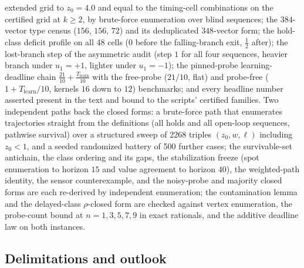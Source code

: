 \documentclass[10pt,twocolumn]{article}
\theoremstyle{plain}
\theoremstyle{definition}
\theoremstyle{remark}
\begin{document}
extended grid to \(z_{0} = 4.0\) and equal to the timing-cell
combinations on the certified grid at \(k \ge 2\), by brute-force
enumeration over blind sequences; the \(384\)-vector type census
(\(156\), \(156\), \(72\)) and its deduplicated \(348\)-vector
form; the hold-class deficit profile on all 48 cells (\(0\) before the
falling-branch exit, \(\tfrac{1}{2}\) after); the lost-branch step of
the asymmetric audit (step \(1\) for all four sequences, heavier
branch under \(u_{1} = +1\), lighter under \(u_{1} = -1\)); the
pinned-probe learning-deadline chain
\(\tfrac{21}{10} + \tfrac{T_{\mathrm{learn}}}{10}\) with the
free-probe (\(21/10\), flat) and probe-free
(\(1 + T_{\mathrm{learn}}/10\), kernels \(16\) down to \(12\))
benchmarks; and every headline
number asserted present in the text and bound to the scripts' certified families. Two independent paths back the closed forms: a
brute-force path that enumerates trajectories straight from the
definitions (all holds and all open-loop sequences, pathwise survival)
over a structured sweep of 2268 triples
\((z_{0}, w, \ell)\) including \(z_{0} < 1\), and a seeded
randomized battery of 500 further cases; the survivable-set antichain,
the class ordering and its gaps, the stabilization freeze (spot
enumeration to horizon \(15\) and value agreement to horizon
\(40\)), the weighted-path identity, the sensor counterexample, and
the noisy-probe and majority closed forms are each re-derived by
independent enumeration; the contamination lemma and the delayed-class
\(\rho\)-closed form are checked against vertex enumeration, the
probe-count bound at \(n = 1, 3, 5, 7, 9\) in exact rationals, and the
additive deadline law on both instances.

\subsection{Delimitations and outlook}\label{scope}
\end{document}
